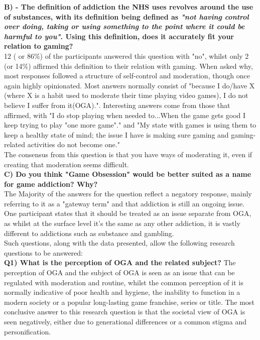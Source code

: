 \documentclass[conference]{IEEEtran}
\begin{document}
 \textbf{B) - The definition of addiction the NHS uses revolves around the use of substances, with its definition being defined as \textit{"not having control over doing, taking or using something to the point where it could be harmful to you"}. Using this definition, does it accurately fit your relation to gaming?}\\

12 ( or 86\%) of the participants answered this question with "no", whilst only 2 (or 14\%) affirmed this definition to their relation with gaming. When asked why, most responses followed a structure of self-control and moderation, though once again highly opinionated. Most answers normally consist of "because I do/have X (where X is a habit used to moderate their time playing video games), I do not believe I suffer from it(OGA).". Interesting answers come from those that affirmed, with "I do stop playing when needed to...When  the game gets good I keep trying to play "one more game"." and "My state with games is using them to keep a healthy state of mind; the issue I have is making sure gaming and gaming-related activities do not become one."\\

The consensus from this question is that you have ways of moderating it, even if creating that moderation seems difficult.\\

 \textbf{C) Do you think "Game Obsession" would be better suited as a name for game addiction? Why?}\\

The Majority of the answers for the question reflect a negatory response, mainly referring to it as a "gateway term" and that addiction is still an ongoing issue. One participant states that it should be treated as an issue separate from OGA, as whilst at the surface level it's the same as any other addiction, it is vastly different to addictions such as substance and gambling.\\

Such questions, along with the data presented, allow the following research questions to be answered:\\

 \textbf{Q1)  What is the perception of OGA and the related subject?}
The perception of OGA and the subject of OGA is seen as an issue that can be regulated with moderation and routine, whilst the common perception of it is normally indicative of poor health and hygiene, the inability to function in a modern society or a popular long-lasting game franchise, series or title. The most conclusive answer to this research question is that the societal view of OGA is seen negatively, either due to generational differences or a common stigma and personification.\\
\end{document}
